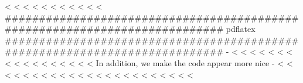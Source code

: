 <%
<%
<%
<%
<%
<%
<%
<%
<%
\else
<%
<%
###########################################################################
pdflatex
###########################################################################
-%
<%
<%
<%
<%
<%
<%
<%
<%
<%
<%
<%
<%
<%
<%
<%
<%
<%
In addition, we make the code appear more nice -%
<%
<%
<%
<%
<%
<%
<%
<%
<%
<%
<%
<%
<%
<%
<%
<%
<%
<%
<%
<%
<%
<%
<%

